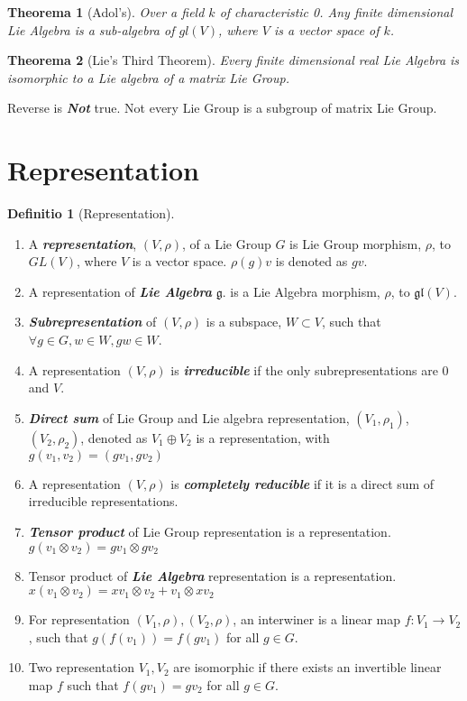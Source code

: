 \documentclass[12pt, a4paper]{article}
\newtheorem{theorem}{Theorema}[section]
\theoremstyle{definition}
\newtheorem{definition}{Definitio}[section]
\theoremstyle{remark}
\renewcommand{\emph}[1]{\textbf{\textit{#1}}}
\begin{document}
\begin{theorem}[Adol's]
Over a field $k$ of characteristic 0. Any finite dimensional Lie Algebra is a sub-algebra of $gl(V)$, where $V$ is a vector space of $k$.  
\end{theorem}

\begin{theorem}[Lie's Third Theorem]
Every finite dimensional real Lie Algebra is isomorphic to a Lie algebra of a matrix Lie Group.
\end{theorem}
Reverse is \emph{Not} true. Not every Lie Group is a subgroup of matrix Lie Group.

\section{Representation}

\begin{definition}[Representation]
	\ 
	\begin{enumerate}	
		\item A \emph{representation}, $(V, \rho)$, of a Lie Group $G$ is Lie Group morphism, $\rho$, to $GL(V)$, where $V$ is a vector space. $\rho(g)v $ is denoted as $gv$.
		\item A representation of \emph{Lie Algebra} $\mathfrak{g}.$ is a Lie Algebra morphism, $\rho$, to $\mathfrak{gl}(V)$.
		\item \emph{Subrepresentation} of $(V, \rho)$ is a subspace, $W \subset V$, such that $\forall g \in G, w \in W, gw \in W$.
		\item A representation $(V, \rho)$ is \emph{irreducible} if the only subrepresentations are $0$ and $V$.
		\item \emph{Direct sum} of Lie Group and Lie algebra representation, $(V_1, \rho_1)$, $(V_2, \rho_2)$, denoted as $V_1 \oplus V_2$ is a representation, with $g(v_1, v_2) = (gv_1, gv_2)$
		\item A representation $(V, \rho)$ is \emph{completely reducible} if it is a direct sum of irreducible representations.
		\item \emph{Tensor product} of Lie Group representation is a representation. $g(v_1 \otimes v_2)=gv_1 \otimes gv_2 $
		\item Tensor product of \emph{Lie Algebra} representation is a representation. $x(v_1 \otimes v_2) = xv_1\otimes v_2 + v_1\otimes xv_2$
		\item For representation $(V_1, \rho), (V_2, \rho)$, an interwiner is a linear map $f: V_1 \rightarrow V_2$, such that $g(f(v_1)) = f(gv_1)$ for all $g \in G$.
		\item Two representation $V_1, V_2$ are isomorphic if there exists an invertible linear map $f$ such that $f(gv_1) = gv_2$ for all $g \in G$.
	\end{enumerate}
\end{definition}
\end{document}
